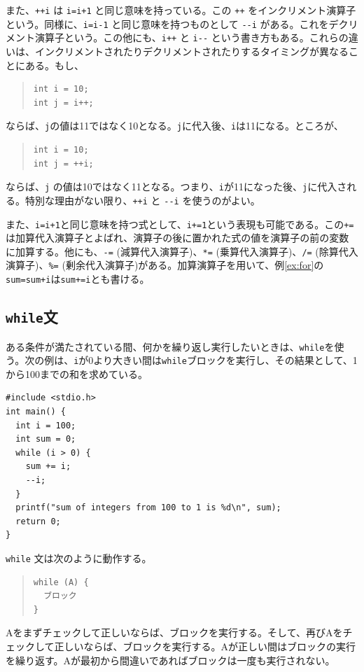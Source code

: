 また、\verb|++i| は \verb|i=i+1| と同じ意味を持っている。この \verb|++| をインクリメント演算子という。同様に、\verb|i=i-1| と同じ意味を持つものとして \verb|--i| がある。これをデクリメント演算子という。この他にも、\verb|i++| と \verb|i--| という書き方もある。これらの違いは、インクリメントされたりデクリメントされたりするタイミングが異なることにある。もし、
\begin{quote}
\begin{verbatim}
int i = 10;
int j = i++;
\end{verbatim}
\end{quote}
ならば、\verb|j|の値は11ではなく10となる。\verb|j|に代入後、\verb|i|は11になる。ところが、
\begin{quote}
\begin{verbatim}
int i = 10;
int j = ++i;
\end{verbatim}
\end{quote}
ならば、\verb|j| の値は10ではなく11となる。つまり、\verb|i|が11になった後、\verb|j|に代入される。特別な理由がない限り、\verb|++i| と \verb|--i| を使うのがよい。

また、\verb|i=i+1|と同じ意味を持つ式として、\verb|i+=1|という表現も可能である。この\verb|+=|は加算代入演算子とよばれ、演算子の後に置かれた式の値を演算子の前の変数に加算する。他にも、\verb|-=| (減算代入演算子)、\verb|*=| (乗算代入演算子)、\verb|/=| (除算代入演算子)、\verb|%=| (剰余代入演算子)がある。加算演算子を用いて、例\ref{ex:for}の\verb|sum=sum+i|は\verb|sum+=i|とも書ける。

\subsection{{\tt while}文}
ある条件が満たされている間、何かを繰り返し実行したいときは、\verb|while|を使う。次の例は、\verb|i|が0より大きい間は\verb|while|ブロックを実行し、その結果として、1から100までの和を求めている。
\begin{reidai}\label{ex:while}
\begin{verbatim}
#include <stdio.h>
int main() {
  int i = 100;
  int sum = 0;
  while (i > 0) {
    sum += i;
    --i;
  }
  printf("sum of integers from 100 to 1 is %d\n", sum);
  return 0;
}
\end{verbatim}
\end{reidai} \noindent
\verb|while| 文は次のように動作する。
\begin{quote}
\begin{verbatim}
while (A) {
  ブロック
}
\end{verbatim}
\end{quote}
Aをまずチェックして正しいならば、ブロックを実行する。そして、再びAをチェックして正しいならば、ブロックを実行する。Aが正しい間はブロックの実行を繰り返す。Aが最初から間違いであればブロックは一度も実行されない。

